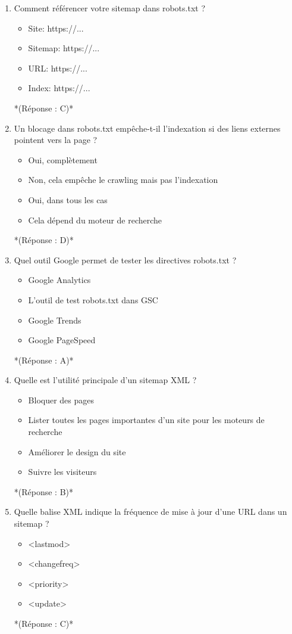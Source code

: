 \documentclass[12pt,a4paper,twoside]{report}
\begin{document}
\begin{enumerate}
\item Comment référencer votre sitemap dans robots.txt ?
\begin{itemize}
\item[A)] Site: https://...
\item[B)] Sitemap: https://...
\item[C)] URL: https://...
\item[D)] Index: https://...
\end{itemize}
*(Réponse : C)*

\item Un blocage dans robots.txt empêche-t-il l'indexation si des liens externes pointent vers la page ?
\begin{itemize}
\item[A)] Oui, complètement
\item[B)] Non, cela empêche le crawling mais pas l'indexation
\item[C)] Oui, dans tous les cas
\item[D)] Cela dépend du moteur de recherche
\end{itemize}
*(Réponse : D)*

\item Quel outil Google permet de tester les directives robots.txt ?
\begin{itemize}
\item[A)] Google Analytics
\item[B)] L'outil de test robots.txt dans GSC
\item[C)] Google Trends
\item[D)] Google PageSpeed
\end{itemize}
*(Réponse : A)*

\item Quelle est l'utilité principale d'un sitemap XML ?
\begin{itemize}
\item[A)] Bloquer des pages
\item[B)] Lister toutes les pages importantes d'un site pour les moteurs de recherche
\item[C)] Améliorer le design du site
\item[D)] Suivre les visiteurs
\end{itemize}
*(Réponse : B)*

\item Quelle balise XML indique la fréquence de mise à jour d'une URL dans un sitemap ?
\begin{itemize}
\item[A)] <lastmod>
\item[B)] <changefreq>
\item[C)] <priority>
\item[D)] <update>
\end{itemize}
*(Réponse : C)*


\end{enumerate}
\end{document}
